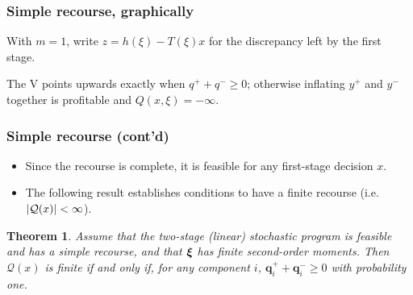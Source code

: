 \documentclass[aspectratio=169]{beamer}
\newtheorem{theo}{Theorem}
\begin{document}
\begin{frame}
\frametitle{Simple recourse, graphically}

With $m = 1$, write $z = h(\xi)-T(\xi)x$ for the discrepancy left by the first stage.

\begin{center}
\end{center}

The V points upwards exactly when $q^+ + q^- \geq 0$; otherwise inflating $y^+$ and $y^-$ together is profitable and $Q(x,\xi) = -\infty$.

\end{frame}


\begin{frame}
\frametitle{Simple recourse (cont'd)}

\begin{itemize}
	\item 
Since the recourse is complete, it is feasible for any first-stage decision $x$.
\item
The following result establishes conditions to have a finite recourse (i.e. $| {\mathcal{Q}}(x) | < \infty$).
\end{itemize}

\begin{theo}
Assume that the two-stage (linear) stochastic program is feasible and has a simple recourse, and that ${\boldsymbol{\xi}}$ has finite second-order moments.
Then $\mathcal{Q}(x)$ is finite if and only if, for any component $i$, $\boldsymbol{q}_i^+ + \boldsymbol{q}_i^- \geq 0$ with probability one.
\end{theo}

\end{frame}
\end{document}
